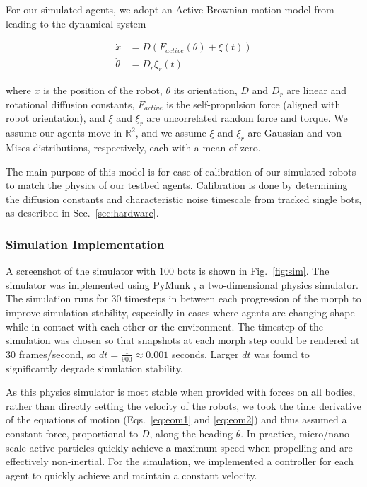 \documentclass[runningheads]{llncs}
\begin{document}
For our simulated agents, we adopt an Active Brownian motion model from \cite{shaebani2020computational} leading to the dynamical system

\vspace{-1em}

\begin{align} \label{eq:eom1}
\dot{x} & = D \left( F_{active}(\theta) + \xi(t)\right) \\
\dot{\theta} & = D_r \xi_r(t) \label{eq:eom2}
\end{align}


where $x$ is the position of the robot, $\theta$ its orientation, $D$ and $D_r$ are linear and rotational diffusion constants, $F_{active}$ is the self-propulsion force (aligned with robot orientation), and $\xi$ and $\xi_r$ are uncorrelated random force and torque. We assume our agents move in $\mathbb{R}^2$, and we assume $\xi$ and $\xi_r$ are Gaussian and von Mises distributions, respectively, each with a mean of zero.

The main purpose of this model is for ease of calibration of our simulated robots to match the physics of our testbed agents. Calibration is done by determining the diffusion constants and characteristic noise timescale from tracked single bots, as described in Sec.~\ref{sec:hardware}.

\subsubsection{Simulation Implementation}

A screenshot of the simulator with 100 bots is shown in Fig.~\ref{fig:sim}. The simulator was implemented using PyMunk \cite{Blomqvist_Pymunk_2023}, a two-dimensional physics simulator. The simulation runs for 30 timesteps in between each progression of the morph to improve simulation stability, especially in cases where agents are changing shape while in contact with each other or the environment. The timestep of the simulation was chosen so that snapshots at each morph step could be rendered at 30 frames/second, so $dt = \frac{1}{900} \approx 0.001$ seconds. Larger $dt$ was found to significantly degrade simulation stability.

As this physics simulator is most stable when provided with forces on all bodies, rather than directly setting the velocity of the robots, we took the time derivative of the equations of motion (Eqs.~\ref{eq:eom1} and \ref{eq:eom2}) and thus assumed a constant force, proportional to $D$, along the heading $\theta$. In practice, micro/nano-scale active particles quickly achieve a maximum speed when propelling and are effectively non-inertial. For the simulation, we implemented a controller for each agent to quickly achieve and maintain a constant velocity.
\end{document}
